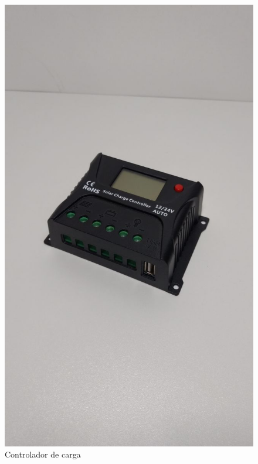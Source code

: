 \begin{figure}[h]
\centering
\includegraphics[keepaspectratio=true,scale=0.15]{figuras/controlador2}
\caption{Controlador de carga}
\label{Figura4}
\end{figure}

%



